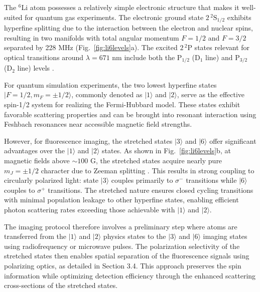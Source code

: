 
The $^6$Li atom possesses a relatively simple electronic structure that makes it well-suited for quantum gas experiments. The electronic ground state $2\,^2\mathrm{S}_{1/2}$ exhibits hyperfine splitting due to the interaction between the electron and nuclear spins, resulting in two manifolds with total angular momentum $F = 1/2$ and $F = 3/2$ separated by 228 MHz (Fig.~\ref{fig:li6levels}a). The excited $2\,^2\mathrm{P}$ states relevant for optical transitions around $\lambda = 671$ nm include both the $\mathrm{P}_{1/2}$ (D$_1$ line) and $\mathrm{P}_{3/2}$ (D$_2$ line) levels \cite{gehm_preparation_2003}.

For quantum simulation experiments, the two lowest hyperfine states $|F = 1/2, m_F = \pm 1/2\rangle$, commonly denoted as $|1\rangle$ and $|2\rangle$, serve as the effective spin-1/2 system for realizing the Fermi-Hubbard model. These states exhibit favorable scattering properties and can be brought into resonant interaction using Feshbach resonances near accessible magnetic field strengths.

However, for fluorescence imaging, the stretched states $|3\rangle$ and $|6\rangle$ offer significant advantages over the $|1\rangle$ and $|2\rangle$ states. As shown in Fig.~\ref{fig:li6levels}b, at magnetic fields above $\sim 100$ G, the stretched states acquire nearly pure $m_J = \pm 1/2$ character due to Zeeman splitting \cite{serwane_deterministic_2011, sibalic_arc_2017}. This results in strong coupling to circularly polarized light: state $|3\rangle$ couples primarily to $\sigma^-$ transitions while $|6\rangle$ couples to $\sigma^+$ transitions. The stretched nature ensures closed cycling transitions with minimal population leakage to other hyperfine states, enabling efficient photon scattering rates exceeding those achievable with $|1\rangle$ and $|2\rangle$.

The imaging protocol therefore involves a preliminary step where atoms are transferred from the $|1\rangle$ and $|2\rangle$ physics states to the $|3\rangle$ and $|6\rangle$ imaging states using radiofrequency or microwave pulses. The polarization selectivity of the stretched states then enables spatial separation of the fluorescence signals using polarizing optics, as detailed in Section 3.4. This approach preserves the spin information while optimizing detection efficiency through the enhanced scattering cross-sections of the stretched states.